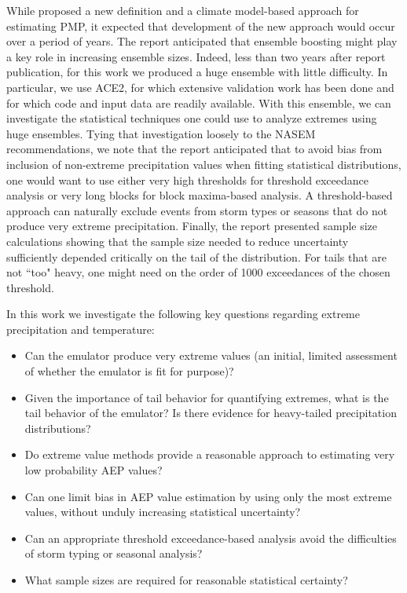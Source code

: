 \documentclass{ametsocV6.1}
\begin{document}
While \cite{nasem2024pmp} proposed a new definition and a climate model-based approach for estimating PMP, it expected that development of the new approach would occur over a period of years. The report anticipated that ensemble boosting might play a key role in increasing ensemble sizes. Indeed, less than two years after report publication, for this work we produced a huge ensemble with little difficulty. In particular, we use ACE2, for which extensive validation work has been done \citep{watt2025ace2} and for which code and input data are readily available. With this ensemble, we can investigate the statistical techniques one could use to analyze extremes using huge ensembles. Tying that investigation loosely to the NASEM recommendations, we note that the report anticipated that to avoid bias from inclusion of non-extreme precipitation values when fitting statistical distributions, one would want to use either very high thresholds  for threshold exceedance analysis or very long blocks for block maxima-based analysis. 
A threshold-based approach can naturally exclude events from storm types or seasons that do not produce very extreme precipitation. Finally, the report presented sample size calculations showing that the sample size needed to reduce uncertainty sufficiently depended critically on the tail of the distribution. For tails that are not ``too" heavy, one might need on the order of 1000 exceedances of the chosen threshold.


In this work we investigate the following key questions regarding extreme precipitation and temperature:

\begin{itemize}
\item Can the emulator produce very extreme values (an initial, limited assessment of whether the emulator is fit for purpose)?
\item  Given the importance of tail behavior for quantifying extremes, what is the tail behavior of the emulator? Is there evidence for heavy-tailed precipitation distributions?
\item Do extreme value methods provide a reasonable approach to estimating very low probability AEP values?
\item Can one limit bias in AEP value estimation by using only the most extreme values, without unduly increasing statistical uncertainty?
\item Can an appropriate threshold exceedance-based analysis avoid the difficulties of storm typing or seasonal analysis?
\item What sample sizes are required for reasonable statistical certainty?
\end{itemize}
\end{document}

